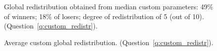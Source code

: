 \begin{figure}[h!]
    \caption[Median custom redistribution]{Global redistribution obtained from median custom parameters: 49\% of winners; 18\% of losers; degree of redistribution of 5 (out of 10). (Question~\ref{q:custom_redistr}).
    }\label{fig:custom_redistr_median}
\end{figure} 

\begin{figure}[h!]
    \caption[Average custom redistribution]{Average custom global redistribution. (Question~\ref{q:custom_redistr}).
    }\label{fig:custom_redistr_mean}
\end{figure}

